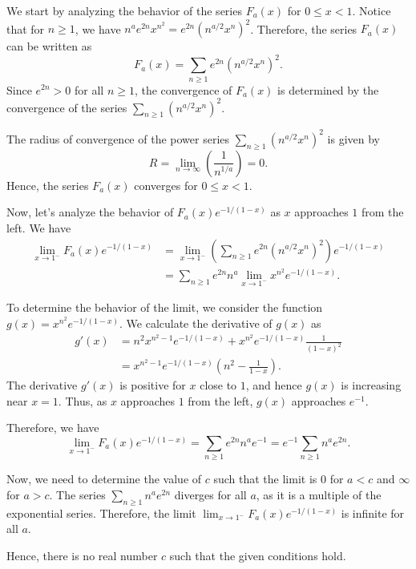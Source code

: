 We start by analyzing the behavior of the series $F_a(x)$ for $0 \leq x < 1$. Notice that for $n \geq 1$, we have $n^a e^{2n} x^{n^2} = e^{2n} (n^{a/2} x^{n})^2$. Therefore, the series $F_a(x)$ can be written as
\[
F_a(x) = \sum_{n \geq 1} e^{2n} (n^{a/2} x^{n})^2.
\]
Since $e^{2n} > 0$ for all $n \geq 1$, the convergence of $F_a(x)$ is determined by the convergence of the series $\sum_{n \geq 1} (n^{a/2} x^{n})^2$. 

The radius of convergence of the power series $\sum_{n \geq 1} (n^{a/2} x^{n})^2$ is given by
\[
R = \lim_{n \to \infty} \left(\frac{1}{n^{1/a}}\right) = 0.
\]
Hence, the series $F_a(x)$ converges for $0 \leq x < 1$.

Now, let's analyze the behavior of $F_a(x) e^{-1/(1-x)}$ as $x$ approaches $1$ from the left. We have
\begin{align*}
\lim_{x \to 1^-} F_a(x) e^{-1/(1-x)} &= \lim_{x \to 1^-} \left(\sum_{n \geq 1} e^{2n} (n^{a/2} x^{n})^2\right) e^{-1/(1-x)} \\
&= \sum_{n \geq 1} e^{2n} n^a \lim_{x \to 1^-} x^{n^2} e^{-1/(1-x)}.
\end{align*}

To determine the behavior of the limit, we consider the function $g(x) = x^{n^2} e^{-1/(1-x)}$. We calculate the derivative of $g(x)$ as
\begin{align*}
g'(x) &= n^2 x^{n^2-1} e^{-1/(1-x)} + x^{n^2} e^{-1/(1-x)} \frac{1}{(1-x)^2} \\
&= x^{n^2-1} e^{-1/(1-x)} (n^2 - \frac{1}{1-x}).
\end{align*}
The derivative $g'(x)$ is positive for $x$ close to $1$, and hence $g(x)$ is increasing near $x=1$. Thus, as $x$ approaches $1$ from the left, $g(x)$ approaches $e^{-1}$.

Therefore, we have
\[
\lim_{x \to 1^-} F_a(x) e^{-1/(1-x)} = \sum_{n \geq 1} e^{2n} n^a e^{-1} = e^{-1} \sum_{n \geq 1} n^a e^{2n}.
\]

Now, we need to determine the value of $c$ such that the limit is $0$ for $a < c$ and $\infty$ for $a > c$. The series $\sum_{n \geq 1} n^a e^{2n}$ diverges for all $a$, as it is a multiple of the exponential series. Therefore, the limit $\lim_{x \to 1^-} F_a(x) e^{-1/(1-x)}$ is infinite for all $a$.

Hence, there is no real number $c$ such that the given conditions hold.
